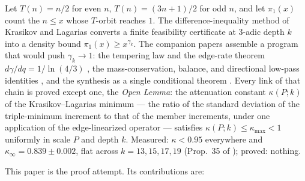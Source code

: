 \documentclass[11pt]{article}
\theoremstyle{definition}
\theoremstyle{remark}
\newcommand{\gam}{\gamma}
\newcommand{\kap}{\kappa}
\begin{document}
Let $T(n) = n/2$ for even $n$, $T(n) = (3n+1)/2$ for odd $n$, and let
$\pi_1(x)$ count the $n \leq x$ whose $T$-orbit reaches $1$. The
difference-inequality method of Krasikov and Lagarias \cite{KL03} converts
a finite feasibility certificate at $3$-adic depth $k$ into a density
bound $\pi_1(x) \geq x^{\gam_k}$. The companion papers \cite{Temp26,
Drift26, Gamma26} assemble a program that would push $\gam_k \to 1$: the
tempering law and the edge-rate theorem $d\gam/dq = 1/\ln(4/3)$
\cite{Temp26}, the mass-conservation, balance, and directional low-pass
identities \cite{Drift26}, and the synthesis as a single conditional
theorem \cite{Gamma26}. Every link of that chain is proved except one, the
\emph{Open Lemma}: the attenuation constant $\kap(P;k)$ of the
Krasikov--Lagarias minimum --- the ratio of the standard deviation of the
triple-minimum increment to that of the member increments, under one
application of the edge-linearized operator --- satisfies
$\kap(P;k) \leq \kap_{\max} < 1$ uniformly in scale $P$ and depth $k$.
Measured: $\kap < 0.95$ everywhere and $\kap_\infty = 0.839 \pm 0.002$,
flat across $k = 13, 15, 17, 19$ (Prop.~35 of \cite{NOTE}); proved:
nothing.

This paper is the proof attempt. Its contributions are:
\end{document}
